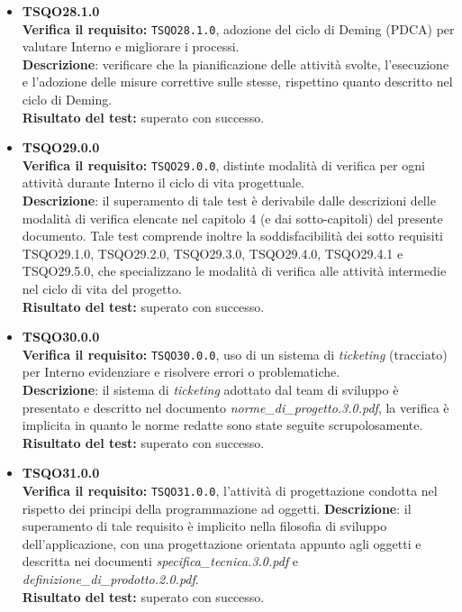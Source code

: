 \begin{itemize}
\item \textbf{TSQO28.1.0}\\
\textbf{Verifica il requisito:} \texttt{TSQO28.1.0}, adozione del ciclo di Deming (PDCA) per valutare Interno e migliorare i processi.\\
\textbf{Descrizione}: verificare che la pianificazione delle attività svolte, l'esecuzione e l'adozione delle misure correttive sulle stesse, rispettino quanto descritto nel ciclo di Deming.\\
\textbf{Risultato del test:} superato con successo.

\item \textbf{TSQO29.0.0}\\
\textbf{Verifica il requisito:} \texttt{TSQO29.0.0}, distinte modalità di verifica per ogni attività durante Interno il ciclo di vita progettuale.\\
\textbf{Descrizione}: il superamento di tale test è derivabile dalle descrizioni delle modalità di verifica elencate nel capitolo 4 (e dai sotto-capitoli) del presente documento. Tale test comprende inoltre la soddisfacibilità dei sotto requisiti TSQO29.1.0, TSQO29.2.0, TSQO29.3.0, TSQO29.4.0, TSQO29.4.1 e TSQO29.5.0, che specializzano le modalità di verifica alle attività intermedie nel ciclo di vita del progetto.\\
\textbf{Risultato del test:} superato con successo.

\item \textbf{TSQO30.0.0}\\
\textbf{Verifica il requisito:} \texttt{TSQO30.0.0}, uso di un sistema di \textit{ticketing} (tracciato) per Interno evidenziare e risolvere errori o problematiche.\\
\textbf{Descrizione}: il sistema di \textit{ticketing} adottato dal team di sviluppo è presentato e descritto nel documento \textit{norme\_di\_progetto.3.0.pdf}, la verifica è implicita in quanto le norme redatte sono state seguite scrupolosamente.\\
\textbf{Risultato del test:} superato con successo.

\item \textbf{TSQO31.0.0}\\
\textbf{Verifica il requisito:} \texttt{TSQO31.0.0}, l'attività di progettazione condotta nel rispetto dei principi della programmazione ad oggetti.
\textbf{Descrizione}: il superamento di tale requisito è implicito nella filosofia di sviluppo dell'applicazione, con una progettazione orientata appunto agli oggetti e descritta nei documenti \textit{specifica\_tecnica.3.0.pdf} e \textit{definizione\_di\_prodotto.2.0.pdf}.\\
\textbf{Risultato del test:} superato con successo.


\end{itemize}
